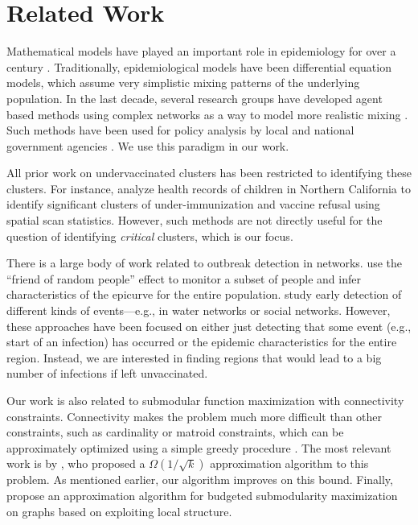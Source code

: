 \section{Related Work}
Mathematical models have played an important role in epidemiology for over a century \cite{anderson+m:book}. Traditionally, epidemiological models have been differential equation models, which assume very simplistic mixing patterns of the underlying population. In the last decade, several research groups have developed agent based methods
using complex networks as a way to model more realistic mixing
\cite{eubank:nature04,longini05:science,fc+06,Liu2015}.
Such methods have been used for policy analysis
by local and national government agencies \cite{halloran:pnas08}.
We use this paradigm in our work.

All prior work on undervaccinated clusters has been restricted to identifying these clusters.
For instance, \cite{lieu2015geographic} analyze health records 
of children in Northern California to identify
significant clusters of under-immunization and vaccine refusal
using spatial scan statistics. However, such methods are not directly useful for the
question of identifying \emph{critical} clusters, which is our focus.

There is a large body of work related to outbreak detection in networks. \cite{christakis:10:sensor} use the ``friend of random people'' effect to monitor a subset of people and infer characteristics of the  epicurve for the entire population. \cite{Leskovec@KDD07} study early detection of different kinds of events---e.g., in water networks or social networks. However, these approaches have been focused on either just detecting that some event (e.g., start of an infection) has occurred or the epidemic characteristics for the entire region. Instead, we are interested in finding regions that would lead to a big number of infections if left unvaccinated.

Our work is also related to submodular function maximization with connectivity constraints. Connectivity makes the problem much more difficult than other constraints, such as cardinality or matroid constraints, which can be approximately optimized using a simple greedy procedure \cite{nemhauser1978analysis}. 
The most relevant work is by \cite{kuo2015maximizing}, who proposed a 
$\Omega(1/\sqrt{k})$ approximation algorithm to this problem. As mentioned earlier, our algorithm \algosubmod{} improves on this bound. Finally,
\cite{krause2006near} propose an approximation algorithm for budgeted 
submodularity maximization on graphs based on exploiting local structure. 

